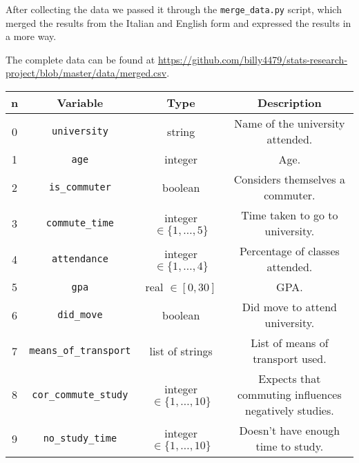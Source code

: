 \documentclass[12pt]{extarticle}
\numberwithin{table}{section}
\numberwithin{figure}{section}
\numberwithin{equation}{section}
\begin{document}
After collecting the data we passed it through the \texttt{merge\_data.py} script,
which merged the results from the Italian and English form and expressed the results in a more
 way.

The complete data can be found at
\url{https://github.com/billy4479/stats-research-project/blob/master/data/merged.csv}.

\begin{table}[H]
	\begin{center}
		\begin{tabular}{|c|c|c|c|}
			\hline
			\textbf{n} & \textbf{Variable}                & \textbf{Type}                  & \textbf{Description}                           \\
			\hline
			\hline
			0          & \texttt{university}              & string                         & Name of the university attended.               \\
			\hline
			1          & \texttt{age}                     & integer                        & Age.                                           \\
			\hline
			2          & \texttt{is\_commuter}            & boolean                        & Considers themselves a commuter.               \\
			\hline
			3          & \texttt{commute\_time}           & integer $\in \{1, \dots, 5\}$  & Time taken to go to university.                \\
			\hline
			4          & \texttt{attendance}              & integer $\in \{1, \dots, 4\}$  & Percentage of classes attended.                \\
			\hline
			5          & \texttt{gpa}                     & real $\in [0,30]$              & GPA.                                           \\
			\hline
			6          & \texttt{did\_move}               & boolean                        & Did move to attend university.                 \\
			\hline
			7          & \texttt{means\_of\_transport}    & list of strings                & List of means of transport used.               \\
			\hline
			8          & \texttt{cor\_commute\_study}     & integer $\in \{1, \dots, 10\}$ & \makecell{Expects that commuting influences    \\negatively studies.}              \\
			\hline
			9          & \texttt{no\_study\_time}         & integer $\in \{1, \dots, 10\}$ & Doesn't have enough time to study.             \\

\end{tabular}
\end{center}
\end{table}
\end{document}

